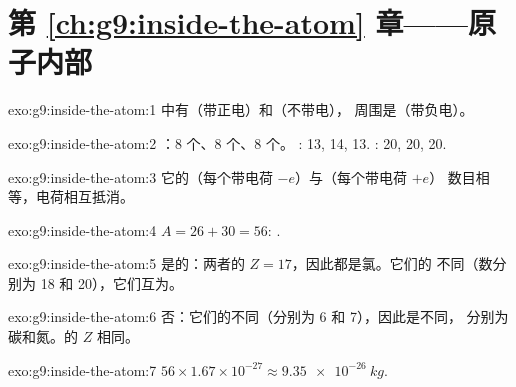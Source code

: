 \section*{第 \ref{ch:g9:inside-the-atom} 章——原子内部}

\begin{solution}{exo:g9:inside-the-atom:1}
中有（带正电）和（不带电），
周围是（带负电）。
\end{solution}

\begin{solution}{exo:g9:inside-the-atom:2}
：8 个、8 个、8 个。
: 13, 14, 13. : 20, 20, 20.
\end{solution}

\begin{solution}{exo:g9:inside-the-atom:3}
它的（每个带电荷 $-e$）与（每个带电荷 $+e$）
数目相等，电荷相互抵消。
\end{solution}

\begin{solution}{exo:g9:inside-the-atom:4}
$A = 26 + 30 = 56$: .
\end{solution}

\begin{solution}{exo:g9:inside-the-atom:5}
是的：两者的 $Z = 17$，因此都是氯。它们的
不同（数分别为 18 和 20），它们互为。
\end{solution}

\begin{solution}{exo:g9:inside-the-atom:6}
否：它们的不同（分别为 6 和 7），因此是不同，
分别为碳和氮。的 $Z$ 相同。
\end{solution}

\begin{solution}{exo:g9:inside-the-atom:7}
$56 \times 1.67 \times 10^{-27} \approx \qty{9.35e-26}{kg}$.
\end{solution}

